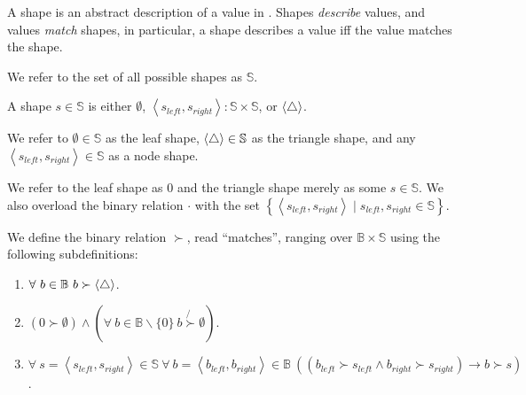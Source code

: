 A shape is an abstract description of a value in \D{}. Shapes \emph{describe}
values, and values \emph{match} shapes, in particular, a shape describes a
value iff the value matches the shape.

\begin{definition} We refer to the set of all possible shapes as
$\mathbb{S}$.\end{definition}

\begin{definition}\label{definition:shape} A shape $s\in\mathbb{S}$ is either
$\emptyset$, $\left\langle s_{left},s_{right} \right\rangle : \mathbb{S} \times
\mathbb{S}$, or $\left\langle\bigtriangleup\right\rangle$.\end{definition}

We refer to $\emptyset\in\mathbb{S}$ as the leaf shape, $\left\langle\bigtriangleup\right\rangle\in\mathbb{S}$ as
the triangle shape, and any $\left\langle s_{left},s_{right} \right\rangle
\in\mathbb{S}$ as a node shape.

\begin{definition} We refer to the leaf shape as $0$ and the triangle shape
merely as some $s\in\mathbb{S}$. We also overload the binary relation $\cdot$
with the set $\left\{ \left\langle s_{left}, s_{right} \right\rangle \mid
s_{left}, s_{right} \in\mathbb{S} \right\}$.\end{definition}

\begin{definition}\label{definition:succ} We define the binary relation
$\succ$, read ``matches'', ranging over $\mathbb{B}\times\mathbb{S}$ using the
following subdefinitions:

\begin{enumerate}

\item \label{definition:any-shape} $\forall\ b\in\mathbb{B}\ b\succ\any$.

\item \label{definition:leaf-shape} $ \left( 0\succ \emptyset \right) \wedge
\left( \forall\ b\in\mathbb{B}\backslash\{0\}\ b\not{\succ} \emptyset \right)$.

\item \label{definition:node-shape} $\forall\ s=\left\langle s_{left},s_{right}
\right\rangle \in\mathbb{S}\ \forall\ b= \left\langle b_{left},b_{right}
\right\rangle \in\mathbb{B}\ \left( \left( b_{left} \succ s_{left} \wedge
b_{right} \succ s_{right} \right) \rightarrow b \succ s \right)$.

\end{enumerate}

\end{definition}

